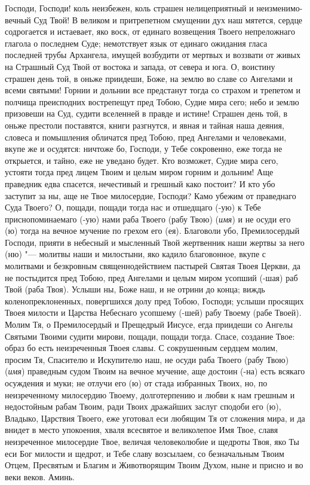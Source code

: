 \begin{mymulticols}
 


Господи, Господи! коль неизбежен, коль страшен нелицеприятный и неизменимо-вечный Суд Твой! В великом и притрепетном смущении дух наш мятется, сердце содрогается и истаевает, яко воск, от единаго возвещения Твоего непреложнаго глагола о последнем Суде; немотствует язык от единаго ожидания гласа последней трубы Архангела, имущей возбудити от мертвых и воззвати от живых на Страшный Суд Твой от востока и запада, от севера и юга. О, воистину страшен день той, в оньже приидеши, Боже, на землю во славе со Ангелами и всеми святыми! Горнии и дольнии все предстанут тогда со страхом и трепетом и полчища преисподних вострепещут пред Тобою, Судие мира сего; небо и землю призовеши на Суд, судити вселенней в правде и истине! Страшен день той, в оньже престоли поставятся, книги разгнутся, и явная и тайная наша деяния, словеса и помышления обличатся пред Тобою, пред Ангелами и человеками, вкупе же и осудятся: ничтоже бо, Господи, у Тебе сокровенно, еже тогда не открыется, и тайно, еже не уведано будет. Кто возможет, Судие мира сего, устояти тогда пред лицем Твоим и целым миром горним и дольним! Аще праведник едва спасется, нечестивый и грешный како постоит? И кто убо заступит за ны, аще не Твое милосердие, Господи? Камо убежим от праведнаго Суда Твоего? О, пощади, пощади тогда нас и отшедщаго (-ую) к Тебе приснопоминаемаго (-ую) нами раба Твоего (рабу Твою) ({\itshape имя}) и не осуди его (ю) тогда на вечное мучение по грехом его (ея). Благоволи убо, Премилосердый Господи, прияти в небесный и мысленный Твой жертвенник наши жертвы за него (ню) "--- молитвы наши и милостыни, яко кадило благовонное, вкупе с молитвами и безкровным священнодействием пастырей Святая Твоея Церкви, да не постыдится пред Тобою, пред Ангелами и целым миром усопший (-шая) раб Твой (раба Твоя). Услыши ны, Боже наш, и не отрини до конца; виждь коленопреклоненных, повергшихся долу пред Тобою, Господи; услыши просящих Твоея милости и Царства Небеснаго усопшему (-шей) рабу Твоему (рабе Твоей). Молим Тя, о Премилосердый и Прещедрый Иисусе, егда приидеши со Ангелы Святыми Твоими судити мирови, пощади, пощади тогда. Спасе, создание Твое: образ бо есть неизреченныя Твоея славы. С сокрушенным сердцем молим, просим Тя, Спасителю и Искупителю наш, не осуди раба Твоего (рабу Твою) ({\itshape имя}) праведным судом Твоим на вечное мучение, аще достоин (-на) есть всякаго осуждения и муки; не отлучи его (ю) от стада избранных Твоих, но, по неизреченному милосердию Твоему, долготерпению и любви к нам грешным и недостойным рабам Твоим, ради Твоих дражайших заслуг сподоби его (ю), Владыко, Царствия Твоего, еже уготовал еси любящим Тя от сложения мира, и да внидет в место упокоения, хваля всесвятое и великолепое Имя Твое, славя неизреченное милосердие Твое, величая человеколюбие и щедроты Твоя, яко Ты еси Бог милости и щедрот, и Тебе славу возсылаем, со безначальным Твоим Отцем, Пресвятым и Благим и Животворящим Твоим Духом, ныне и присно и во веки веков. Аминь. 

\end{mymulticols}

